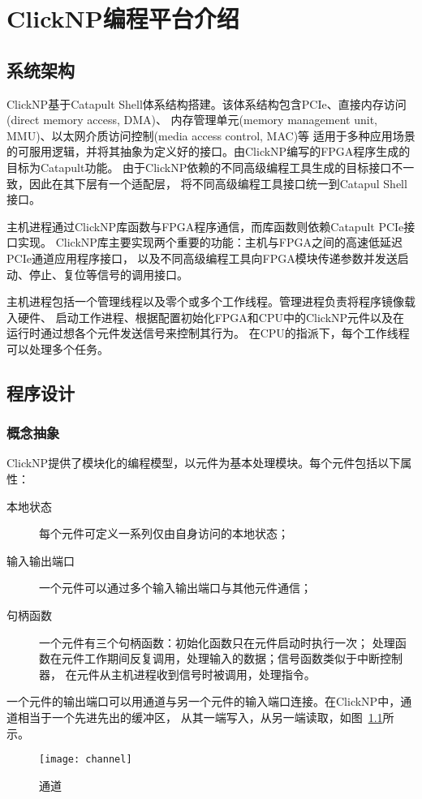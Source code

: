 \chapter{ClickNP编程平台介绍}
\section{系统架构}
ClickNP基于Catapult Shell体系结构搭建。该体系结构包含PCIe、直接内存访问(direct memory access, DMA)、
内存管理单元(memory management unit, MMU)、以太网介质访问控制(media access control, MAC)等
适用于多种应用场景的可服用逻辑，并将其抽象为定义好的接口。由ClickNP编写的FPGA程序生成的目标为Catapult功能。
由于ClickNP依赖的不同高级编程工具生成的目标接口不一致，因此在其下层有一个适配层，
将不同高级编程工具接口统一到Catapul Shell接口。

主机进程通过ClickNP库函数与FPGA程序通信，而库函数则依赖Catapult PCIe接口实现。
ClickNP库主要实现两个重要的功能：主机与FPGA之间的高速低延迟PCIe通道应用程序接口，
以及不同高级编程工具向FPGA模块传递参数并发送启动、停止、复位等信号的调用接口。

主机进程包括一个管理线程以及零个或多个工作线程。管理进程负责将程序镜像载入硬件、
启动工作进程、根据配置初始化FPGA和CPU中的ClickNP元件以及在运行时通过想各个元件发送信号来控制其行为。
在CPU的指派下，每个工作线程可以处理多个任务。

\section{程序设计}
\subsection{概念抽象}
ClickNP提供了模块化的编程模型，以元件为基本处理模块。每个元件包括以下属性：
\begin{description}
\item[本地状态]每个元件可定义一系列仅由自身访问的本地状态；
\item[输入输出端口]一个元件可以通过多个输入输出端口与其他元件通信；
\item[句柄函数]一个元件有三个句柄函数：初始化函数只在元件启动时执行一次；
处理函数在元件工作期间反复调用，处理输入的数据；信号函数类似于中断控制器，
在元件从主机进程收到信号时被调用，处理指令。
\end{description}

一个元件的输出端口可以用通道与另一个元件的输入端口连接。在ClickNP中，通道相当于一个先进先出的缓冲区，
从其一端写入，从另一端读取，如图~\ref{fig:channel}所示。
\begin{figure}
\centering
\texttt{[image: channel]}
\caption{通道} \label{fig:channel}
\end{figure}

